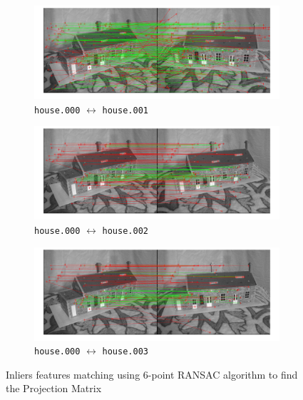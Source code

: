 \documentclass{ethz_report}
\begin{document}
\begin{figure}[h]
    \centering
    \begin{subfigure}[b]{.5\textwidth}
        \centering
        \includegraphics[width=1\linewidth]{images/ini_inliers_outliers_1}
        \caption{\texttt{house.000} $\leftrightarrow$ \texttt{house.001}}
    \end{subfigure}%
    \begin{subfigure}[b]{.5\textwidth}
        \centering
        \includegraphics[width=1\linewidth]{images/ini_inliers_outliers_2}
        \caption{\texttt{house.000} $\leftrightarrow$ \texttt{house.002}}
    \end{subfigure}
    \begin{subfigure}[b]{.5\textwidth}
        \centering
        \includegraphics[width=1\linewidth]{images/ini_inliers_outliers_3}
        \caption{\texttt{house.000} $\leftrightarrow$ \texttt{house.003}}
    \end{subfigure}
    \caption{Inliers features matching using 6-point RANSAC algorithm to find the Projection Matrix}
    \label{fig:inliers_projection_matrix}
\end{figure}
\end{document}
